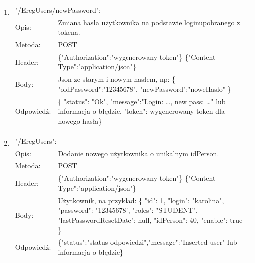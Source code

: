 \documentclass[12pt, titlepage]{article}
\begin{document}
\begin{enumerate}
	\item
	{\renewcommand{\arraystretch}{1.5}
	\begin{tabular}[t]{p{3cm} p{15cm}}
	\multicolumn{2}{l}{"/EregUsers/newPassword":} \\
	Opis: &  Zmiana hasła użytkownika na podstawie loginu\newline pobranego z tokena. \\
	Metoda: & POST \\
	Header: & \{"Authorization":"wygenerowany token"\} \newline \{"Content-Type":"application/json"\} \\
	Body: & Json ze starym i nowym hasłem, np: \newline
	\{
	"oldPassword":"12345678", \newline
	"newPassword":"noweHaslo"
\}\\
	Odpowiedź: & \{
    "status": "Ok",\newline
    "message":"Login: \ldots, new pass: \ldots" lub informacja o błędzie, \newline "token": wygenerowany token dla nowego hasła\} 
	\end{tabular}}
	
	\item
	{\renewcommand{\arraystretch}{1.5}
	\begin{tabular}[t]{p{3cm} p{15cm}}
	\multicolumn{2}{l}{"/EregUsers":} \\
	Opis: &  Dodanie nowego użytkownika o unikalnym idPerson. \\
	Metoda: & POST \\
	Header: & \{"Authorization":"wygenerowany token"\} \newline \{"Content-Type":"application/json"\} \\
	Body: & Użytkownik, na przykład: \newline \{
    "id": 1,\newline
    "login": "karolina",\newline
    "password": "12345678",\newline
    "roles": "STUDENT",\newline
    "lastPasswordResetDate": null,\newline
    "idPerson": 40,\newline
    "enable": true\newline
\} \\
	Odpowiedź: & \{"status":"status odpowiedzi",\newline "message":"Inserted user" lub informacja o błędzie\} \\
	\end{tabular}}
	
\end{enumerate}
\end{document}
